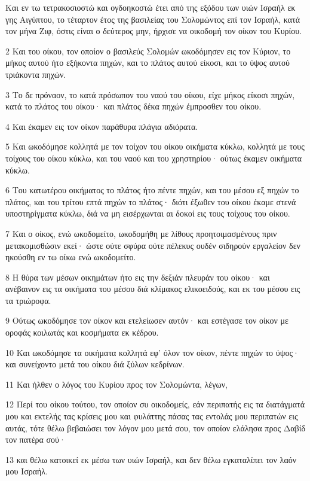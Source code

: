 \par Και εν τω τετρακοσιοστώ και ογδοηκοστώ έτει από της εξόδου των υιών Ισραήλ εκ γης Αιγύπτου, το τέταρτον έτος της βασιλείας του Σολομώντος επί τον Ισραήλ, κατά τον μήνα Ζιφ, όστις είναι ο δεύτερος μην, ήρχισε να οικοδομή τον οίκον του Κυρίου.
\par 2 Και του οίκου, τον οποίον ο βασιλεύς Σολομών ωκοδόμησεν εις τον Κύριον, το μήκος αυτού ήτο εξήκοντα πηχών, και το πλάτος αυτού είκοσι, και το ύψος αυτού τριάκοντα πηχών.
\par 3 Το δε πρόναον, το κατά πρόσωπον του ναού του οίκου, είχε μήκος είκοσι πηχών, κατά το πλάτος του οίκου· και πλάτος δέκα πηχών έμπροσθεν του οίκου.
\par 4 Και έκαμεν εις τον οίκον παράθυρα πλάγια αδιόρατα.
\par 5 Και ωκοδόμησε κολλητά με τον τοίχον του οίκου οικήματα κύκλω, κολλητά με τους τοίχους του οίκου κύκλω, και του ναού και του χρηστηρίου· ούτως έκαμεν οικήματα κύκλω.
\par 6 Του κατωτέρου οικήματος το πλάτος ήτο πέντε πηχών, και του μέσου εξ πηχών το πλάτος, και του τρίτου επτά πηχών το πλάτος· διότι έξωθεν του οίκου έκαμε στενά υποστηρίγματα κύκλω, διά να μη εισέρχωνται αι δοκοί εις τους τοίχους του οίκου.
\par 7 Και ο οίκος, ενώ ωκοδομείτο, ωκοδομήθη με λίθους προητοιμασμένους πριν μετακομισθώσιν εκεί· ώστε ούτε σφύρα ούτε πέλεκυς ουδέν σιδηρούν εργαλείον δεν ηκούσθη εν τω οίκω ενώ ωκοδομείτο.
\par 8 Η θύρα των μέσων οικημάτων ήτο εις την δεξιάν πλευράν του οίκου· και ανέβαινον εις τα οικήματα του μέσου διά κλίμακος ελικοειδούς, και εκ του μέσου εις τα τριώροφα.
\par 9 Ούτως ωκοδόμησε τον οίκον και ετελείωσεν αυτόν· και εστέγασε τον οίκον με οροφάς κοιλωτάς και κοσμήματα εκ κέδρου.
\par 10 Και ωκοδόμησε τα οικήματα κολλητά εφ' όλον τον οίκον, πέντε πηχών το ύψος· και συνείχοντο μετά του οίκου διά ξύλων κεδρίνων.
\par 11 Και ήλθεν ο λόγος του Κυρίου προς τον Σολομώντα, λέγων,
\par 12 Περί του οίκου τούτου, τον οποίον συ οικοδομείς, εάν περιπατής εις τα διατάγματά μου και εκτελής τας κρίσεις μου και φυλάττης πάσας τας εντολάς μου περιπατών εις αυτάς, τότε θέλω βεβαιώσει τον λόγον μου μετά σου, τον οποίον ελάλησα προς Δαβίδ τον πατέρα σού·
\par 13 και θέλω κατοικεί εκ μέσω των υιών Ισραήλ, και δεν θέλω εγκαταλίπει τον λαόν μου Ισραήλ.

